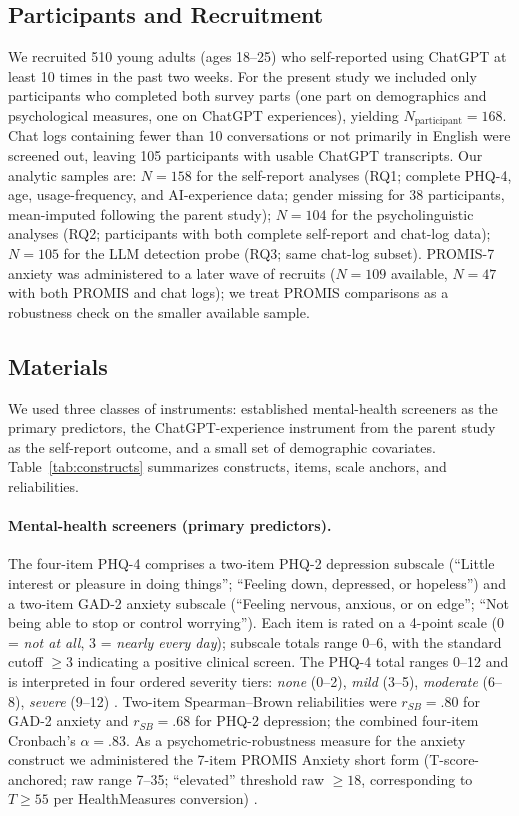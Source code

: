\documentclass[letterpaper]{article}
\begin{document}
\subsection{Participants and Recruitment}
We recruited 510 young adults (ages 18--25) who self-reported using ChatGPT at least 10 times in the past two weeks. For the present study we included only participants who completed both survey parts (one part on demographics and psychological measures, one on ChatGPT experiences), yielding $N_{\mathrm{participant}}=168$. Chat logs containing fewer than 10 conversations or not primarily in English were screened out, leaving 105 participants with usable ChatGPT transcripts. Our analytic samples are: $N=158$ for the self-report analyses (RQ1; complete PHQ-4, age, usage-frequency, and AI-experience data; gender missing for 38 participants, mean-imputed following the parent study); $N=104$ for the psycholinguistic analyses (RQ2; participants with both complete self-report and chat-log data); $N=105$ for the LLM detection probe (RQ3; same chat-log subset). PROMIS-7 anxiety was administered to a later wave of recruits ($N=109$ available, $N=47$ with both PROMIS and chat logs); we treat PROMIS comparisons as a robustness check on the smaller available sample.

\subsection{Materials}
We used three classes of instruments: established mental-health screeners as the primary predictors, the ChatGPT-experience instrument from the parent study as the self-report outcome, and a small set of demographic covariates. Table~\ref{tab:constructs} summarizes constructs, items, scale anchors, and reliabilities.

\paragraph{Mental-health screeners (primary predictors).} The four-item PHQ-4 \citep{kroenke2009phq4} comprises a two-item PHQ-2 depression subscale (``Little interest or pleasure in doing things''; ``Feeling down, depressed, or hopeless'') and a two-item GAD-2 anxiety subscale (``Feeling nervous, anxious, or on edge''; ``Not being able to stop or control worrying''). Each item is rated on a 4-point scale (0 = \emph{not at all}, 3 = \emph{nearly every day}); subscale totals range 0--6, with the standard cutoff $\geq 3$ indicating a positive clinical screen. The PHQ-4 total ranges 0--12 and is interpreted in four ordered severity tiers: \emph{none} (0--2), \emph{mild} (3--5), \emph{moderate} (6--8), \emph{severe} (9--12) \citep{lowe2010phq4}. Two-item Spearman--Brown reliabilities were $r_{SB}=.80$ for GAD-2 anxiety and $r_{SB}=.68$ for PHQ-2 depression; the combined four-item Cronbach's $\alpha=.83$. As a psychometric-robustness measure for the anxiety construct we administered the 7-item PROMIS Anxiety short form (T-score-anchored; raw range 7--35; ``elevated'' threshold raw $\geq 18$, corresponding to $T\geq 55$ per HealthMeasures conversion) \citep{pilkonis2011promis}.
\end{document}
